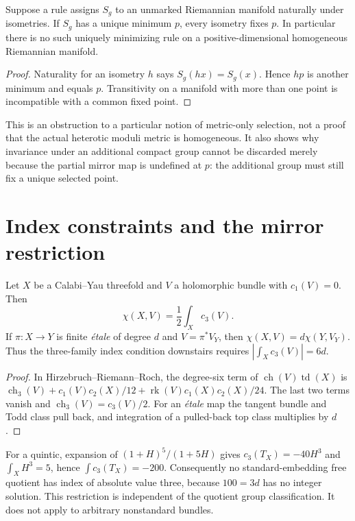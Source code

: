 \begin{proposition}
Suppose a rule assigns $S_g$ to an unmarked Riemannian manifold naturally
under isometries. If $S_g$ has a unique minimum $p$, every isometry fixes
$p$. In particular there is no such uniquely minimizing rule on a
positive-dimensional homogeneous Riemannian manifold.
\end{proposition}
\begin{proof}
Naturality for an isometry $h$ says $S_g(hx)=S_g(x)$. Hence $hp$ is
another minimum and equals $p$. Transitivity on a manifold with more
than one point is incompatible with a common fixed point.
\end{proof}
This is an obstruction to a particular notion of metric-only selection,
not a proof that the actual heterotic moduli metric is homogeneous.
It also shows why invariance under an additional compact group cannot be
discarded merely because the partial mirror map is undefined at $p$:
the additional group must still fix a unique selected point.

\section{Index constraints and the mirror restriction}
\begin{proposition}\label{prop:index}
Let $X$ be a Calabi--Yau threefold and $V$ a holomorphic bundle with
$c_1(V)=0$. Then
\[
 \chi(X,V)=\frac12\int_Xc_3(V).
\]
If $\pi:X\to Y$ is finite \emph{\'etale} of degree $d$ and
$V=\pi^*V_Y$, then $\chi(X,V)=d\chi(Y,V_Y)$. Thus the three-family
index condition downstairs requires $|\int_Xc_3(V)|=6d$.
\end{proposition}
\begin{proof}
In Hirzebruch--Riemann--Roch, the degree-six term of
$\operatorname{ch}(V)\operatorname{td}(X)$ is
$\operatorname{ch}_3(V)+c_1(V)c_2(X)/12+\operatorname{rk}(V)c_1(X)c_2(X)/24$.
The last two terms vanish and $\operatorname{ch}_3(V)=c_3(V)/2$.
For an \emph{\'etale} map the tangent bundle and Todd class pull back,
and integration of a pulled-back top class multiplies by $d$.
\end{proof}

For a quintic, expansion of $(1+H)^5/(1+5H)$ gives
$c_3(T_X)=-40H^3$ and $\int_XH^3=5$, hence $\int c_3(T_X)=-200$.
Consequently no standard-embedding
free quotient has index of absolute value three, because $100=3d$ has no
integer solution. This restriction is independent of the quotient group
classification. It does not apply to arbitrary nonstandard bundles.

